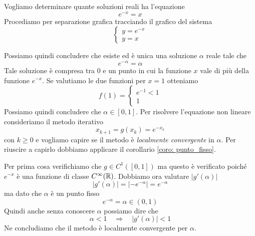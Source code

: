\begin{example}
	Vogliamo determinare quante soluzioni reali ha l'equazione
	\[ e^{-x} = x \]
	Procediamo per separazione grafica tracciando il grafico del sistema
	\[
		\begin{cases}
			y = e^{-x} \\
			y = x
		\end{cases}
	\]
	\begin{center}
	\end{center}
	Possiamo quindi concludere che esiste ed è unica una soluzione $\alpha$ reale tale che
	\[ e^{-\alpha} = \alpha \]
	Tale soluzione è compresa tra 0 e un punto in cui la funzione $x$ vale di più della funzione $e^{-x}$.
	Se valutiamo le due funzioni per $x = 1$ otteniamo
	\[
		f(1) = \begin{cases}
			e^{-1} < 1 \\
			1
		\end{cases}
	\]
	Possiamo quindi concludere che $\alpha \in [0, 1]$. Per risolvere l'equazione non lineare consideriamo il
	metodo iterativo
	\[ x_{k+1} = g(x_k) = e^{-x_k} \]
	con $k \geq 0$ e vogliamo capire se il metodo è \emph{localmente convergente} in $\alpha$. Per riuscire a
	capirlo dobbiamo applicare il corollario \ref{coro: punto_fisso}.

	Per prima cosa verifichiamo che $g \in C^1([0, 1])$ ma questo è verificato poiché $e^{-x}$ è una funzione
	di classe $C^\infty(\mathbb{R})$. Dobbiamo ora valutare $|g'(\alpha)|$
	\[ |g'(\alpha)| = |-e^{-\alpha}| = e^{-\alpha} \]
	ma dato che $\alpha$ è un punto fisso
	\[ e^{-\alpha} = \alpha \in (0, 1) \]
	Quindi anche senza conoscere $\alpha$ possiamo dire che
	\[ \alpha < 1 \quad \Rightarrow \quad |g'(\alpha)| < 1\]
	Ne concludiamo che il metodo è localmente convergente per $\alpha$.


\end{example}
